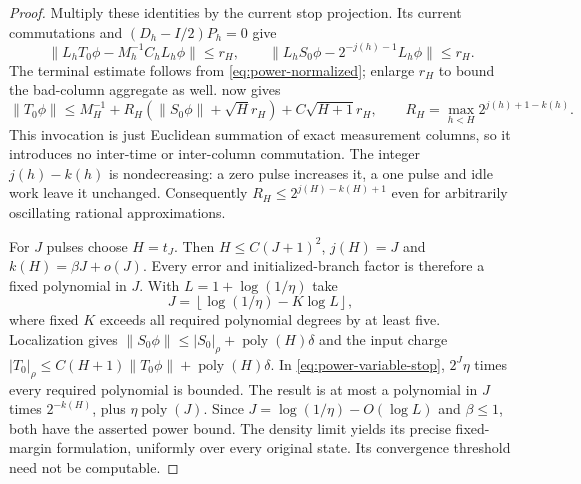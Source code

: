 \begin{proof}
Multiply these identities by the current stop projection. Its current commutations and $(D_h-I/2)P_h=0$ give
\[
 \|L_hT_0\phi-M_h^{-1}C_hL_h\phi\|\le r_H,\qquad
 \|L_hS_0\phi-2^{-j(h)-1}L_h\phi\|\le r_H.
\]
The terminal estimate follows from \eqref{eq:power-normalized}; enlarge $r_H$ to bound the bad-column aggregate as well.  now gives
\begin{equation}\label{eq:power-variable-stop}
 \|T_0\phi\|\le M_H^{-1}+R_H(\|S_0\phi\|+\sqrt H r_H)+C\sqrt{H+1}r_H,
 \qquad R_H=\max_{h<H}2^{j(h)+1-k(h)}.
\end{equation}
This invocation is just Euclidean summation of exact measurement columns, so it introduces no inter-time or inter-column commutation.
The integer $j(h)-k(h)$ is nondecreasing: a zero pulse increases it, a one pulse and idle work leave it unchanged. Consequently $R_H\le2^{j(H)-k(H)+1}$ even for arbitrarily oscillating rational approximations.

For $J$ pulses choose $H=t_J$. Then $H\le C(J+1)^2$, $j(H)=J$ and $k(H)=\beta J+o(J)$. Every error and initialized-branch factor is therefore a fixed polynomial in $J$. With $L=1+\log(1/\eta)$ take
\[
 J=\left\lfloor\log(1/\eta)-K\log L\right\rfloor,
\]
where fixed $K$ exceeds all required polynomial degrees by at least five. Localization gives $\|S_0\phi\|\le|S_0|_\rho+\operatorname{poly}(H)\delta$ and the input charge $|T_0|_\rho\le C(H+1)\|T_0\phi\|+\operatorname{poly}(H)\delta$.
In \eqref{eq:power-variable-stop}, $2^J\eta$ times every required polynomial is bounded. The result is at most a polynomial in $J$ times $2^{-k(H)}$, plus $\eta\operatorname{poly}(J)$. Since $J=\log(1/\eta)-O(\log L)$ and $\beta\le1$, both have the asserted power bound. The density limit yields its precise fixed-margin formulation, uniformly over every original state. Its convergence threshold need not be computable.
\end{proof}

